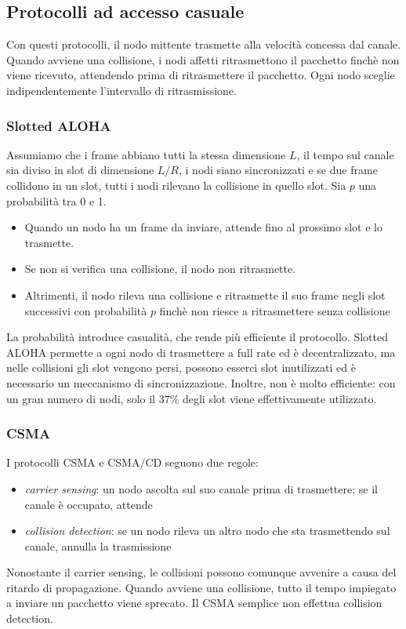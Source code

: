 \documentclass[11pt]{book}
\begin{document}
\subsection{Protocolli ad accesso casuale}
Con questi protocolli, il nodo mittente trasmette alla velocità concessa dal canale. Quando avviene una collisione, i nodi
affetti ritrasmettono il pacchetto finchè non viene ricevuto, attendendo prima di ritrasmettere il pacchetto. Ogni nodo 
sceglie indipendentemente l'intervallo di ritrasmissione. 
\subsubsection{Slotted ALOHA}
Assumiamo che i frame abbiano tutti la stessa dimensione $L$, il tempo sul canale sia diviso in slot di dimensione $L/R$,
i nodi siano sincronizzati e se due frame collidono in un slot, tutti i nodi rilevano la collisione in quello slot. 
Sia $p$ una probabilità tra 0 e 1.
\begin{itemize}
    \item Quando un nodo ha un frame da inviare, attende fino al prossimo slot e lo trasmette.
    \item Se non si verifica una collisione, il nodo non ritrasmette.
    \item Altrimenti, il nodo rileva una collisione e ritrasmette il suo frame negli slot successivi con probabilità $p$ 
    finchè non riesce a ritrasmettere senza collisione
\end{itemize}
La probabilità introduce casualità, che rende più efficiente il protocollo.
Slotted ALOHA permette a ogni nodo di trasmettere a full rate ed è decentralizzato, ma nelle collisioni gli slot vengono
persi, possono esserci slot inutilizzati ed è necessario un meccanismo di sincronizzazione. Inoltre, non è molto efficiente:
con un gran numero di nodi, solo il 37\% degli slot viene effettivamente utilizzato.
\subsubsection{CSMA}
I protocolli CSMA e CSMA/CD seguono due regole: 
\begin{itemize}
    \item \textit{carrier sensing}: un nodo ascolta sul suo canale prima di trasmettere; se il canale è occupato, attende
    \item \textit{collision detection}: se un nodo rileva un altro nodo che sta trasmettendo sul canale, annulla la trasmissione
\end{itemize}
Nonostante il carrier sensing, le collisioni possono comunque avvenire a causa del ritardo di propagazione. Quando avviene
una collisione, tutto il tempo impiegato a inviare un pacchetto viene sprecato. Il CSMA semplice non effettua collision 
detection.
\end{document}
